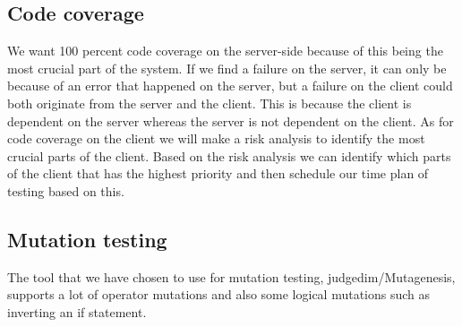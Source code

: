 \documentclass[a4paper,12pt]{memoir}
\begin{document}
\subsection{Code coverage}
We want 100 percent code coverage on the server-side because of this being the most crucial part of the system. If we find a failure on the server, it can only be because of an error that happened on the server, but a failure on the client could both originate from the server and the client. This is because the client is dependent on the server whereas the server is not dependent on the client. As for code coverage on the client we will make a risk analysis to identify the most crucial parts of the client. Based on the risk analysis we can identify which parts of the client that has the highest priority and then schedule our time plan of testing based on this.

\subsection{Mutation testing}
The tool that we have chosen to use for mutation testing, judgedim/Mutagenesis, supports a lot of operator mutations and also some logical mutations such as inverting an if statement.
\end{document}

